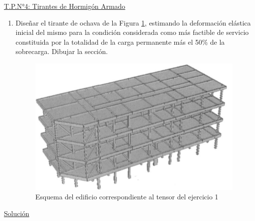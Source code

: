 \begin{center}
\underline{\Large{T.P.N°4: Tirantes de Hormigón Armado}}
\end{center}

\begin{enumerate}
\item Diseñar el tirante de ochava de la Figura \ref{figura1}, estimando la deformación elástica inicial del mismo para la condición considerada como más factible de servicio constituida por la totalidad de la carga permanente más el 50\% de la sobrecarga. Dibujar la sección.

\begin{figure}[H]
\begin{center}
	 \includegraphics[scale = 0.9]{chapters/chapter_1/images/figura1.png}
     \caption{Esquema del edificio correspondiente al tensor del ejercicio 1}
     \label{figura1}
\end{center}
\end{figure}

\end{enumerate}

\begin{center}
\underline{\Large{Solución}}
\end{center}

